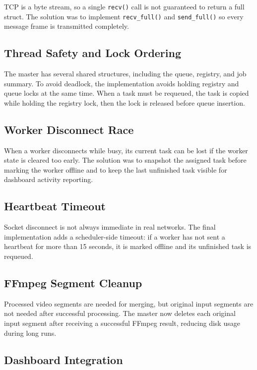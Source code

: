 \documentclass[12pt,a4paper]{article}
\begin{document}
TCP is a byte stream, so a single \texttt{recv()} call is not guaranteed to return a full struct. The solution was to implement \texttt{recv\_full()} and \texttt{send\_full()} so every message frame is transmitted completely.

\subsection{Thread Safety and Lock Ordering}

The master has several shared structures, including the queue, registry, and job summary. To avoid deadlock, the implementation avoids holding registry and queue locks at the same time. When a task must be requeued, the task is copied while holding the registry lock, then the lock is released before queue insertion.

\subsection{Worker Disconnect Race}

When a worker disconnects while busy, its current task can be lost if the worker state is cleared too early. The solution was to snapshot the assigned task before marking the worker offline and to keep the last unfinished task visible for dashboard activity reporting.

\subsection{Heartbeat Timeout}

Socket disconnect is not always immediate in real networks. The final implementation adds a scheduler-side timeout: if a worker has not sent a heartbeat for more than 15 seconds, it is marked offline and its unfinished task is requeued.

\subsection{FFmpeg Segment Cleanup}

Processed video segments are needed for merging, but original input segments are not needed after successful processing. The master now deletes each original input segment after receiving a successful FFmpeg result, reducing disk usage during long runs.

\subsection{Dashboard Integration}
\end{document}
